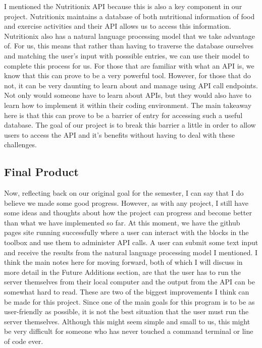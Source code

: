 \documentclass{article}
\theoremstyle{theorem}
\theoremstyle{definition}
\theoremstyle{remark}
\begin{document}
I mentioned the Nutritionix API because this is also a key component in our project. Nutritionix maintains a database of both nutritional information of food and exercise activities and their API allows us to access this information. Nutritionix also has a natural language processing model that 
we take advantage of. For us, this means that rather than having to traverse the database ourselves and matching the user's input with posssible entries, we can use their model to complete this process for us. For those that are familiar with what an API is, we know that this can prove to be a very 
powerful tool. However, for those that do not, it can be very daunting to learn about and manage using API call endpoints. Not only would someone have to learn about APIs, but they would also have to learn how to implement it within their coding environment. The main takeaway here is that this can 
prove to be a barrier of entry for accessing such a useful database. The goal of our project is to break this barrier a little in order to allow users to access the API and it's benefits without having to deal with these challenges. \\


\subsection{Final Product}  

Now, reflecting back on our original goal for the semester, I can say that I do believe we made some good progress. However, as with any project, I still have some ideas and thoughts about how the project can progress and become better than what we have implemented so far. At this moment, we have 
the github pages site running successfully where a user can interact with the blocks in the toolbox and use them to administer API calls. A user can submit some text input and receive the results from the natural language processing model I mentioned. I think the main notes here for moving forward, both of 
which I will discuss in more detail in the Future Additions section, are that the user has to run the server themselves from their local computer and the output from the API can be somewhat hard to read. These are two of the biggest improvements I think can be made for this project. Since one of the main 
goals for this program is to be as user-friendly as possible, it is not the best situation that the user must run the server themselves. Although this might seem simple and small to us, this might be very difficult for someone who has never touched a command terminal or line of code ever. \\
\end{document}
